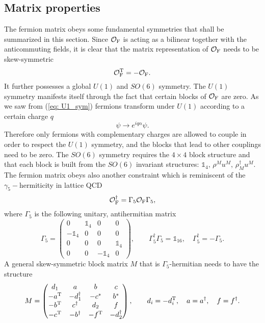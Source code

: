 \subsection{Matrix properties} \label{sec: matrix_prop}
The fermion matrix obeys some fundamental symmetries that shall be summarized in this section. Since $\mathcal{O}_{\rm F}$ is acting as a bilinear together with the anticommuting  fields, it is clear that the matrix representation of $\mathcal{O}_{\rm F}$ needs to be skew-symmetric
%
%
\begin{equation}
\mathcal{O}_{\rm F}^{\rm T} = -\mathcal{O}_{\rm F}.
\label{eq: skew_sym}
\end{equation}
%
%
It further possesses a global $U(1)$ and $SO(6)$ symmetry. The $U(1)$ symmetry manifests itself through the fact that certain blocks of $\mathcal{O}_{\rm F}$ are zero. As we saw from (\ref{eq: U1_sym}) fermions transform under $U(1)$ according to a certain charge $q$
%
%
\begin{equation}
\psi \to e^{iq\alpha}\psi.
\end{equation}
%
%
Therefore only fermions with complementary charges are allowed to couple in order to respect the $U(1)$ symmetry, and the blocks that lead to other couplings need to be zero. The $SO(6)$ symmetry requires the $4\times 4$ block structure and that each block is built from the $SO(6)$ invariant structures: $\mathds{1}_{4},\,\rho^{M}u^{M},\,\rho_{M}^{\dagger}u^{M}$. The fermion matrix obeys also another constraint which is reminiscent of the $\gamma_{5}-$hermiticity in lattice QCD \cite{montvay_lattice}
%
%
\begin{equation}
\mathcal{O}_{\rm F}^{\dagger} = \Gamma_{5}\mathcal{O}_{\rm F}\Gamma_{5},
\label{eq: G5_sym}
\end{equation}
%
%
where $\Gamma_{5}$ is the following unitary, antihermitian matrix
%
%
\begin{equation}
\Gamma_{5} = \begin{pmatrix}
0 & \mathds{1}_{4} & 0 & 0 \\
 -\mathds{1}_{4}& 0 & 0 & 0 \\
0 & 0 & 0 & \mathds{1}_{4} \\
0 & 0 & -\mathds{1}_{4} & 0
\end{pmatrix} ,\qquad
\Gamma_{5}^{\dagger}\Gamma_{5}= \mathds{1}_{16}, \quad \Gamma_{5}^{\dagger} = -\Gamma_{5}.
\end{equation}
%
%
A general skew-symmetric block matrix $M$ that is $\Gamma_{5}$-hermitian needs to have the structure
%
%
\begin{equation}
M=\begin{pmatrix}
d_{1} & a & b & c \\
-a^{\rm T} & -d_{1}^{\dagger} & -c^{*} & b^{*} \\
-b^{\rm T} & c^{\dagger} & d_{2} & f \\
-c^{\rm T} & -b^{\dagger} & -f^{\rm T} & -d_{2}^{\dagger}
\end{pmatrix} ,\qquad d_{i}=-d_{i}^{\rm T},\quad a=a^{\dagger}, \quad f=f^{\dagger}.
\label{eq: G5_herm_mat}
\end{equation}
